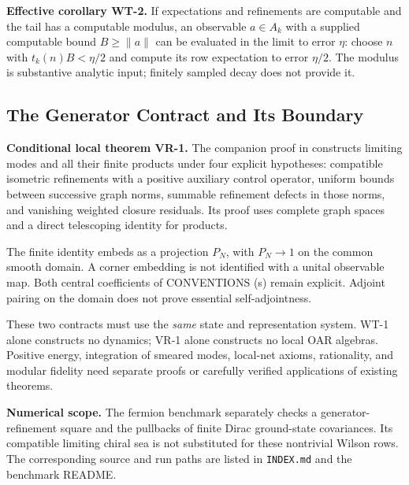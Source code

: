 \textbf{Effective corollary WT-2.} If expectations and refinements are
computable and the tail has a computable modulus, an observable $a\in A_k$
with a supplied computable bound $B\ge\|a\|$ can be evaluated in the
limit to error $\eta$: choose $n$ with $t_k(n)B<\eta/2$ and compute its
row expectation to error $\eta/2$. The modulus is substantive analytic
input; finitely sampled decay does not provide it.

\subsection{The Generator Contract and Its Boundary}

\textbf{Conditional local theorem VR-1.} The companion proof in
 constructs limiting
modes and all their finite products under four explicit hypotheses:
compatible isometric refinements with a positive auxiliary control operator,
uniform bounds between successive graph norms, summable refinement defects
in those norms, and vanishing weighted closure residuals. Its proof uses
complete graph spaces and a direct telescoping identity for products.

The finite identity embeds as a projection $P_N$, with $P_N\to1$ on the
common smooth domain. A corner embedding is not identified with a unital
observable map. Both central coefficients of CONVENTIONS (s) remain explicit.
Adjoint pairing on the domain does not prove essential self-adjointness.

These two contracts must use the \emph{same} state and representation
system. WT-1 alone constructs no dynamics; VR-1 alone constructs no local
OAR algebras. Positive energy, integration of smeared modes, local-net
axioms, rationality, and modular fidelity need separate proofs or carefully
verified applications of existing theorems.

\textbf{Numerical scope.} The fermion benchmark separately checks a
generator-refinement square and the pullbacks of finite Dirac ground-state
covariances. Its compatible limiting chiral sea is not substituted for
these nontrivial Wilson rows. The corresponding source and run paths are
listed in \texttt{INDEX.md} and the benchmark README.
